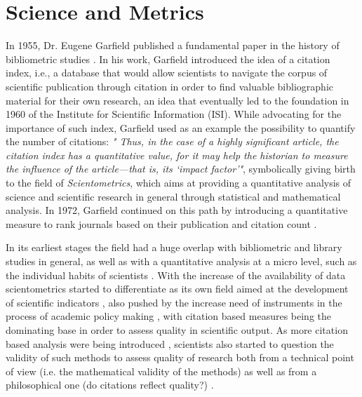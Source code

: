 \chapter{Science and Metrics}\label{Science and Metrics}

In 1955, Dr. Eugene Garfield published a fundamental paper in the history of bibliometric studies \cite{Garfield108}. In his work,
Garfield introduced the idea of a citation index, i.e., a database that would allow scientists to navigate the corpus of scientific publication through citation in order
to find valuable bibliographic material for their own research, an idea that eventually led to the foundation in 1960 of the Institute for Scientific Information (ISI).
While advocating for the importance of such index, Garfield used as an example the possibility to quantify the number of citations: \textit{"
Thus, in the case of a highly significant article, the citation index has a quantitative value, for it may help
the historian to measure the influence of the
article—that is, its ‘impact factor’"}, symbolically giving birth to the field of \textit{Scientometrics}, which
aims at providing a quantitative analysis of science and scientific research in general through statistical and mathematical analysis.
In 1972, Garfield
continued on this path by introducing a quantitative measure to rank journals based on their publication and citation count \cite{Garfield1972}. 

In its earliest
stages the field had a huge overlap with bibliometric and library studies in general, as well as with a quantitative analysis at a micro level, such as 
the individual habits of scientists \cite{069102832X}. With the increase of the availability of data scientometrics started to differentiate as its own
field aimed at the development of scientific indicators \cite{1208.4566}, also pushed by the increase need of instruments in the process of academic policy making 
\cite{doi:10.1080/09537329508524202}, with citation based measures being the dominating base in order to assess quality in scientific output. 
As more citation based analysis were being introduced \cite{Cole1972,vanRaan1993}, scientists also started to question the validity of such methods
to assess quality of research both from a technical point of view (i.e. the mathematical validity of the methods) as well as from a philosophical
one (do citations reflect quality?) \cite{ASI:ASI5,ASI:ASI7,MacRoberts1989,Seglen1997}.

